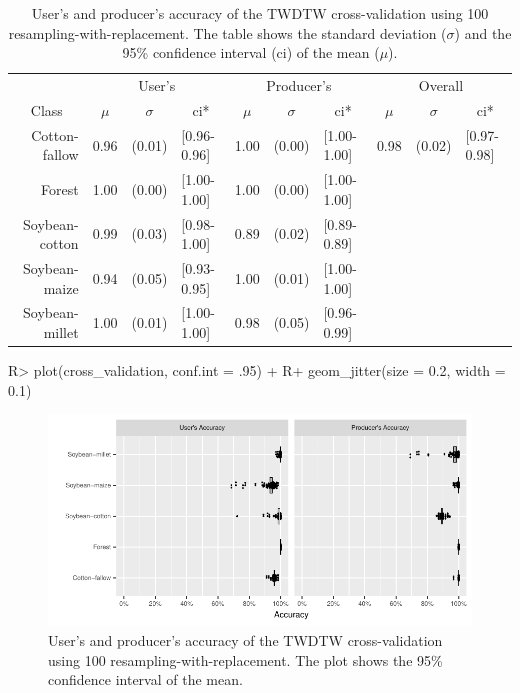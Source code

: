 \documentclass[article,shortnames]{jss}
\begin{document}
\begin{table}[!ht]
\centering
\begin{tabular}{rlllllllll}
  \hline
   & \multicolumn{3}{c}{User's} & \multicolumn{3}{c}{Producer's} & \multicolumn{3}{c}{Overall}\\
\multicolumn{1}{c}{Class} & \multicolumn{1}{c}{$\mu$} & \multicolumn{1}{c}{$\sigma$} & \multicolumn{1}{c}{ci*} & \multicolumn{1}{c}{$\mu$} & \multicolumn{1}{c}{$\sigma$} & \multicolumn{1}{c}{ci*} & \multicolumn{1}{c}{$\mu$} & \multicolumn{1}{c}{$\sigma$} & \multicolumn{1}{c}{ci*}\\
 \hline
Cotton-fallow & 0.96 & (0.01) & [0.96-0.96] & 1.00 & (0.00) & [1.00-1.00] & 0.98 & (0.02) & [0.97-0.98] \\ 
  Forest & 1.00 & (0.00) & [1.00-1.00] & 1.00 & (0.00) & [1.00-1.00] &  &  &  \\ 
  Soybean-cotton & 0.99 & (0.03) & [0.98-1.00] & 0.89 & (0.02) & [0.89-0.89] &  &  &  \\ 
  Soybean-maize & 0.94 & (0.05) & [0.93-0.95] & 1.00 & (0.01) & [1.00-1.00] &  &  &  \\ 
  Soybean-millet & 1.00 & (0.01) & [1.00-1.00] & 0.98 & (0.05) & [0.96-0.99] &  &  &  \\ 
   \hline 
\end{tabular}
\caption{\label{tab:cross-validation} User's and producer's accuracy of the TWDTW cross-validation using 100 resampling-with-replacement. The table shows the standard deviation ($\sigma$) and the 95\% confidence interval (ci) of the mean ($\mu$).} 
\end{table}

\begin{CodeChunk}

\begin{CodeInput}
R> plot(cross_validation, conf.int = .95) + 
R+   geom_jitter(size = 0.2, width = 0.1) 
\end{CodeInput}
\begin{figure}[!ht]

{\centering \includegraphics{dtwSat_files/figure-latex/plot-accuracy-1} 

}

\caption[User's and producer's accuracy of the TWDTW cross-validation using 100 resampling-with-replacement]{User's and producer's accuracy of the TWDTW cross-validation using 100 resampling-with-replacement. The plot shows the 95\% confidence interval of the mean.}\label{fig:plot-accuracy}
\end{figure}
\end{CodeChunk}
\end{document}
